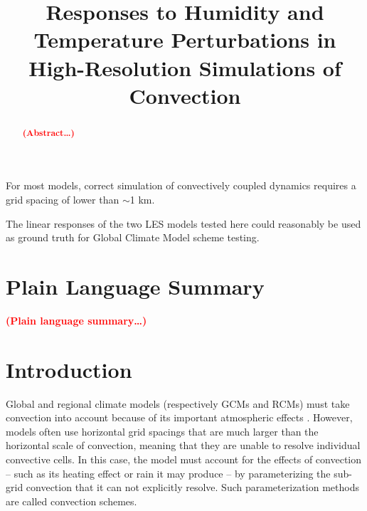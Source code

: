 \documentclass[draft]{agujournal2019}
\newcommand{\todo}[1]{\textcolor{red}{\textbf{(#1)}}}
\begin{document}
\title{Responses to Humidity and Temperature Perturbations in High-Resolution Simulations of Convection}




\begin{keypoints}
    \item For most models, correct simulation of convectively coupled dynamics
    requires a grid spacing of lower than $\sim$1 km.
    \item The linear responses of the two LES models tested here could
    reasonably be used as ground truth for Global Climate Model scheme testing.
\end{keypoints}

\justifying
\begin{abstract}
\todo{Abstract\ldots}
\end{abstract}

\section*{Plain Language Summary}
\todo{Plain language summary\ldots}

\section{Introduction}

Global and regional climate models (respectively GCMs and RCMs) must take
convection into account because of its important atmospheric effects
\cite{Manabe_JAS_1964, Wallace_2006}. However, models often use horizontal grid
spacings that are much larger than the horizontal scale of convection, meaning
that they are unable to resolve individual convective cells. In this case, the
model must account for the effects of convection -- such as its heating effect
or rain it may produce -- by parameterizing the sub-grid convection that it can
not explicitly resolve. Such parameterization methods are called convection
schemes. 
\end{document}

